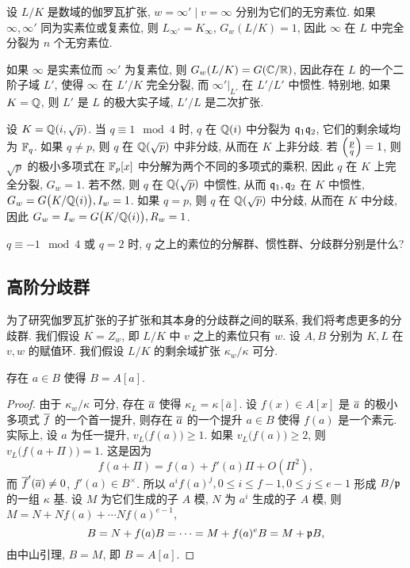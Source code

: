 \begin{example}
设 $L/K$ 是数域的伽罗瓦扩张, $w=\infty'\mid v=\infty$ 分别为它们的无穷素位. 如果 $\infty,\infty'$ 同为实素位或复素位, 则 $L_{\infty'}=K_\infty$, $G_w(L/K)=1$, 因此 $\infty$ 在 $L$ 中完全分裂为 $n$ 个无穷素位.

如果 $\infty$ 是实素位而 $\infty'$ 为复素位, 则 $G_w(L/K)=G({\mathbb{C}}/{\mathbb{R}})$, 因此存在 $L$ 的一个二阶子域 $L'$, 使得 $\infty$ 在 $L'/K$ 完全分裂, 而 $\infty'|_{L'}$ 在 $L'/L'$ 中惯性. 特别地, 如果 $K={\mathbb{Q}}$, 则 $L'$ 是 $L$ 的极大实子域, $L'/L$ 是二次扩张.
\end{example}

\begin{example}
设 $K={\mathbb{Q}}(i,\sqrt{p})$. 
当 $q\equiv 1\mod 4$ 时, $q$ 在 ${\mathbb{Q}}(i)$ 中分裂为 ${\mathfrak{q}}_1{\mathfrak{q}}_2$, 它们的剩余域均为 ${\mathbb{F}}_q$. 如果 $q\neq p$, 则 $q$ 在 ${\mathbb{Q}}(\sqrt{p})$ 中非分歧, 从而在 $K$ 上非分歧. 若 $\left(\frac{{p}}{q}\right)=1$, 则 $\sqrt{p}$ 的极小多项式在 ${\mathbb{F}}_p[x]$ 中分解为两个不同的多项式的乘积, 因此 $q$ 在 $K$ 上完全分裂, $G_w=1$. 若不然, 则 $q$ 在 ${\mathbb{Q}}(\sqrt{p})$ 中惯性, 从而 ${\mathfrak{q}}_1,{\mathfrak{q}}_2$ 在 $K$ 中惯性, $G_w=G\bigl(K/{\mathbb{Q}}(i)\bigr), I_w=1$. 如果 $q=p$, 则 $q$ 在 ${\mathbb{Q}}(\sqrt{p})$ 中分歧, 从而在 $K$ 中分歧, 因此 $G_w=I_w=G\bigl(K/{\mathbb{Q}}(i)\bigr), R_w=1$.
\end{example}

\begin{exercise}
$q\equiv -1 \mod 4$ 或 $q=2$ 时, $q$ 之上的素位的分解群、惯性群、分歧群分别是什么?
\end{exercise}


\subsection{高阶分歧群}
为了研究伽罗瓦扩张的子扩张和其本身的分歧群之间的联系, 我们将考虑更多的分歧群. 我们假设 $K=Z_w$, 即 $L/K$ 中 $v$ 之上的素位只有 $w$. 设 $A,B$ 分别为 $K,L$ 在 $v,w$ 的赋值环.
我们假设 $L/K$ 的剩余域扩张 $\kappa_w/\kappa$ 可分.

\begin{lemma}{}{}
存在 $a\in B$ 使得 $B=A[a]$.
\end{lemma}
\begin{proof}
由于 $\kappa_w/\kappa$ 可分, 存在 $\overline a$ 使得 $\kappa_L=\kappa[\bar a]$. 设 $f(x)\in A[x]$ 是 $\overline a$ 的极小多项式 $\overline f$ 的一个首一提升, 则存在 $\overline a$ 的一个提升 $a\in B$ 使得 $f(a)$ 是一个素元. 实际上, 设 $a$ 为任一提升, $v_L\bigl(f(a)\bigr)\ge 1$. 如果 $v_L\bigl(f(a)\bigr)\ge 2$, 则 $v_L\bigl(f(a+\Pi)\bigr)=1$. 这是因为
  \[f(a+\Pi)=f(a)+f'(a)\Pi+O(\Pi^2),\]
而 $\overline f'(\overline a)\neq 0$, $f'(a)\in B^\times$. 所以 $a^i f(a)^j,0\le i\le f-1,0\le j\le e-1$ 形成 $B/{\mathfrak{p}}$ 的一组 $\kappa$ 基. 设 $M$ 为它们生成的子 $A$ 模, $N$ 为 $a^i$ 生成的子 $A$ 模, 则 $M=N+Nf(a)+\cdots Nf(a)^{e-1}$,
  \[B=N+f(a)B=\cdots=M+f(a)^eB=M+{\mathfrak{p}} B,\]
由中山引理, $B=M$, 即 $B=A[a]$.
\end{proof}


